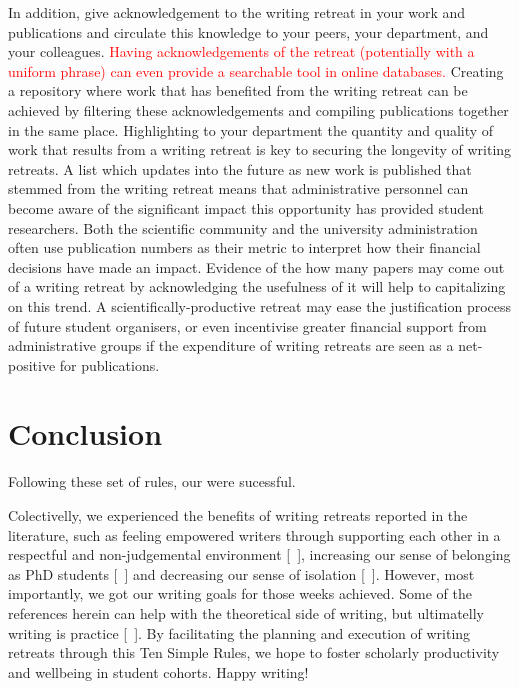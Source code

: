 \documentclass[10pt,letterpaper]{article}
\begin{document}

In addition, give acknowledgement to the writing retreat in your work and publications and circulate this knowledge to your peers, your department, and your colleagues. \textcolor{red}{Having acknowledgements of the retreat (potentially with a uniform phrase) can even provide a searchable tool in online databases.} Creating a repository where work that has benefited from the writing retreat can be achieved by filtering these acknowledgements and compiling publications together in the same place. Highlighting to your department the quantity and quality of work that results from a writing retreat is key to securing the longevity of writing retreats. A list which updates into the future as new work is published that stemmed from the writing retreat means that administrative personnel can become aware of the significant impact this opportunity has provided student researchers. Both the scientific community and the university administration often use publication numbers as their metric to interpret how their financial decisions have made an impact. Evidence of the how many papers may come out of a writing retreat by acknowledging the usefulness of it will help to capitalizing on this trend. A scientifically-productive retreat may ease the justification process of future student organisers, or even incentivise greater financial support from administrative groups if the expenditure of writing retreats are seen as a net-positive for publications.

\section*{Conclusion}

Following these set of rules, our  were sucessful. 

Colectivelly, we experienced the benefits of writing retreats reported in the literature, such as feeling empowered writers through supporting each other in a respectful and non-judgemental environment [~\cite{papen2018}], increasing our sense of belonging as PhD students [~\cite{omeara}] and decreasing our sense of isolation [~\cite{eardley2021}]. However, most importantly, we got our writing goals for those weeks achieved. Some of the references herein can help with the theoretical side of writing, but ultimatelly writing is practice [~\cite{peterson2018, grogan2021}]. By facilitating the planning and execution of writing retreats through this Ten Simple Rules, we hope to foster scholarly productivity and wellbeing in student cohorts. Happy writing!
\end{document}
